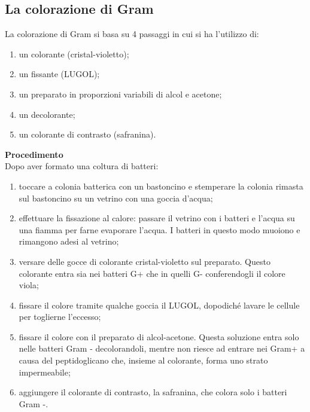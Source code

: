 \documentclass[11pt]{book}
\begin{document}
\subsection{La colorazione di Gram}
La colorazione di Gram si basa su 4 passaggi in cui si ha l’utilizzo di:
\begin{enumerate}
\item un colorante (cristal-violetto);
\item un fissante (LUGOL);
\item un preparato in proporzioni variabili di alcol e acetone;
\item un decolorante; 
\item un colorante di contrasto (safranina).
\end{enumerate}

\textbf{Procedimento}\\
Dopo aver formato una coltura di batteri:
\begin{enumerate}
\item toccare a colonia batterica con un bastoncino e stemperare la colonia rimasta sul bastoncino su un vetrino con una goccia d’acqua;
\item effettuare la fissazione al calore: passare il vetrino con i batteri e l’acqua su una fiamma per farne evaporare l’acqua. I batteri in questo modo muoiono e rimangono adesi al vetrino;
\item versare delle gocce di colorante cristal-violetto sul preparato. Questo colorante entra sia nei batteri G+ che in quelli G- conferendogli il colore viola;
\item fissare il colore tramite qualche goccia il LUGOL, dopodiché lavare le cellule per toglierne l’eccesso;
\item fissare il colore con il preparato di alcol-acetone. Questa soluzione entra solo nelle batteri Gram - decolorandoli, mentre non riesce ad entrare nei Gram+ a causa del peptidoglicano che, insieme al colorante, forma uno strato impermeabile;
\item aggiungere il colorante di contrasto, la safranina, che colora solo i batteri Gram -.
\end{enumerate}
\end{document}
